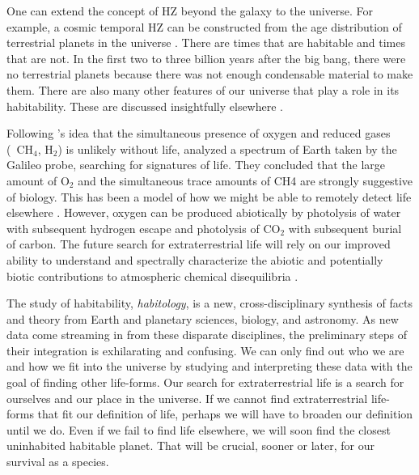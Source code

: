 One can extend the concept of HZ beyond the galaxy to the universe. For example, a cosmic temporal HZ can be constructed from the age distribution of terrestrial planets in the universe \citep{Lineweaver2001}. There are times that are habitable and times that are not. In the first two to three billion years after the big bang, there were no terrestrial planets because there was not enough condensable material to make them. There are also many other features of our universe that play a role in its habitability. These are discussed insightfully elsewhere \citep{Dicke1961,Carter1974,Barrow1988,Bostrom2002,Carroll2006,Barrow2006}.

Following \citeauthor{Lovelock1965}'s \citeyear{Lovelock1965} idea that the simultaneous presence of oxygen and reduced gases (\eg~CH$_{4}$, H$_{2}$) is unlikely without life, \citet{Sagan1993} analyzed a spectrum of Earth taken by the Galileo probe, searching for signatures of life. They concluded that the large amount of O$_{2}$ and the simultaneous trace amounts of CH4 are strongly suggestive of biology. This has been a model of how we might be able to remotely detect life elsewhere \citep{Leger1999}. However, oxygen can be produced abiotically by photolysis of water with subsequent hydrogen escape and photolysis of CO$_{2}$ with subsequent burial of carbon. The future search for extraterrestrial life will rely on our improved ability to understand and spectrally characterize the abiotic and potentially biotic contributions to atmospheric chemical disequilibria \citep{Kasting2009,Krissansen-Totton2016,Seager2010,Vazquez2010,Kaltenegger2011b}.

The study of habitability, \textit{habitology}, is a new, cross-disciplinary synthesis of facts and theory from Earth and planetary sciences, biology, and astronomy. As new data come streaming in from these disparate disciplines, the preliminary steps of their integration is exhilarating and confusing. We can only find out who we are and how we fit into the universe by studying and interpreting these data with the goal of finding other life-forms. Our search for extraterrestrial life is a search for ourselves and our place in the universe. If we cannot find extraterrestrial life-forms that fit our definition of life, perhaps we will have to broaden our definition until we do. Even if we fail to find life elsewhere, we will soon find the closest uninhabited habitable planet. That will be crucial, sooner or later, for our survival as a species.